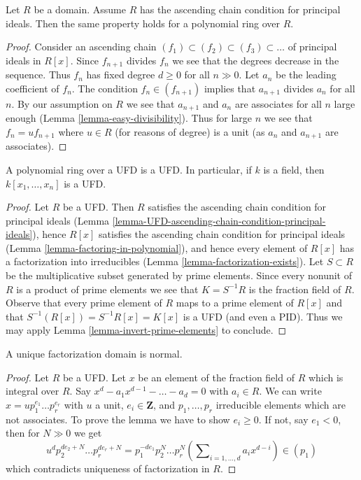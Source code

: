\begin{lemma}
\label{lemma-factoring-in-polynomial}
Let $R$ be a domain. Assume $R$ has the ascending chain condition
for principal ideals. Then the same property holds for a polynomial
ring over $R$.
\end{lemma}

\begin{proof}
Consider an ascending chain $(f_1) \subset (f_2) \subset (f_3) \subset \ldots$
of principal ideals in $R[x]$. Since $f_{n + 1}$ divides $f_n$ we see
that the degrees decrease in the sequence. Thus $f_n$
has fixed degree $d \geq 0$ for all $n \gg 0$. Let $a_n$ be the
leading coefficient of $f_n$. The condition $f_n \in (f_{n + 1})$
implies that $a_{n + 1}$ divides $a_n$ for all $n$.
By our assumption on $R$ we see that $a_{n + 1}$ and $a_n$
are associates for all $n$ large enough (Lemma \ref{lemma-easy-divisibility}).
Thus for large $n$ we see that $f_n = u f_{n + 1}$ where
$u \in R$ (for reasons of degree) is a unit (as $a_n$ and $a_{n + 1}$
are associates).
\end{proof}

\begin{lemma}
\label{lemma-polynomial-ring-UFD}
A polynomial ring over a UFD is a UFD. In particular, if $k$ is a field,
then $k[x_1, \ldots, x_n]$ is a UFD.
\end{lemma}

\begin{proof}
Let $R$ be a UFD. Then $R$ satisfies the ascending chain condition for
principal ideals
(Lemma \ref{lemma-UFD-ascending-chain-condition-principal-ideals}),
hence $R[x]$ satisfies the ascending chain condition for principal
ideals (Lemma \ref{lemma-factoring-in-polynomial}), and hence every
element of $R[x]$ has a factorization into irreducibles
(Lemma \ref{lemma-factorization-exists}).
Let $S \subset R$ be the multiplicative subset
generated by prime elements. Since every nonunit of $R$ is a product
of prime elements we see that $K = S^{-1}R$ is the fraction field
of $R$. Observe that every prime element of $R$ maps to a prime element
of $R[x]$ and that $S^{-1}(R[x]) = S^{-1}R[x] = K[x]$ is a
UFD (and even a PID). Thus we may apply
Lemma \ref{lemma-invert-prime-elements} to conclude.
\end{proof}

\begin{lemma}
\label{lemma-UFD-normal}
A unique factorization domain is normal.
\end{lemma}

\begin{proof}
Let $R$ be a UFD. Let $x$ be an element of the fraction field of
$R$ which is integral over $R$. Say $x^d - a_1 x^{d - 1} - \ldots - a_d = 0$
with $a_i \in R$. We can write
$x = u p_1^{e_1} \ldots p_r^{e_r}$ with $u$ a unit, $e_i \in \mathbf{Z}$,
and $p_1, \ldots, p_r$ irreducible elements which are not associates.
To prove the lemma we have to show $e_i \geq 0$. If not, say $e_1 < 0$,
then for $N \gg 0$ we get
$$
u^d p_2^{de_2 + N} \ldots p_r^{de_r + N} =
p_1^{-de_1}p_2^N \ldots p_r^N(
\sum\nolimits_{i = 1, \ldots, d} a_i x^{d - i} ) \in (p_1)
$$
which contradicts uniqueness of factorization in $R$.
\end{proof}

